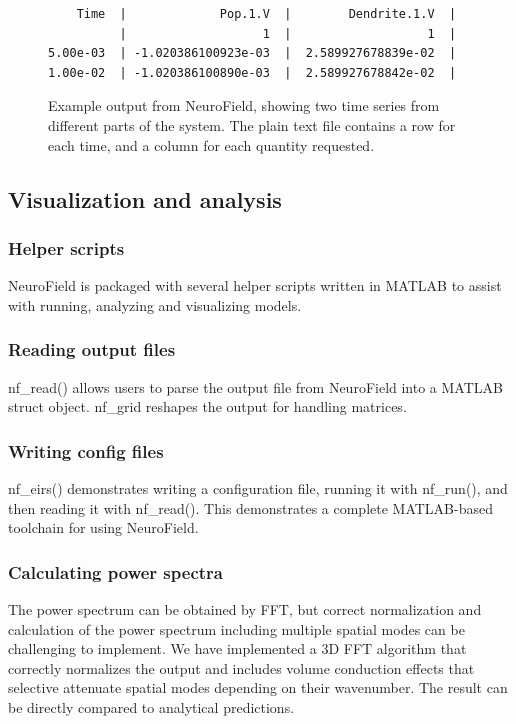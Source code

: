 \documentclass[preprint,review,10pt,authoryear,letterpaper]{elsarticle}
\begin{document}
\begin{figure}[!b]
\begin{center}
\begin{lstlisting}
    Time  |             Pop.1.V  |        Dendrite.1.V  |
          |                   1  |                   1  |
5.00e-03  | -1.020386100923e-03  |  2.589927678839e-02  |
1.00e-02  | -1.020386100890e-03  |  2.589927678842e-02  |
\end{lstlisting}
\caption{Example output from NeuroField, showing two time series from different parts of the system. The plain text file contains a row for each time, and a column for each quantity requested.}
\label{fig:eirs_cycle}
\end{center}
\end{figure}

\subsection{Visualization and analysis}

\subsubsection{Helper scripts}
NeuroField is packaged with several helper scripts written in MATLAB to assist with running, analyzing and visualizing models. 

\subsubsection{Reading output files}
nf\_read() allows users to parse the output file from NeuroField into a MATLAB struct object.
nf\_grid reshapes the output for handling matrices. 

\subsubsection{Writing config files}
nf\_eirs() demonstrates writing a configuration file, running it with nf\_run(), and then reading it with nf\_read(). This demonstrates a complete MATLAB-based toolchain for using NeuroField.

\subsubsection{Calculating power spectra}
The power spectrum can be obtained by FFT, but correct normalization and calculation of the power spectrum including multiple spatial modes can be challenging to implement. We have implemented a 3D FFT algorithm that correctly normalizes the output and includes volume conduction effects that selective attenuate spatial modes depending on their wavenumber. The result can be directly compared to analytical predictions.
\end{document}
